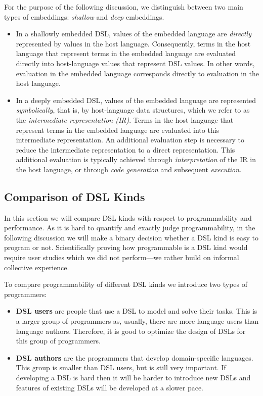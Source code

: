 For the purpose of the following discussion, we distinguish between two main types of embeddings: \emph{shallow} and \emph{deep} embeddings.

  \begin{itemize}

  \item In a shallowly embedded DSL, values of the embedded language
    are \emph{directly} represented by values in the host language.
    Consequently, terms in the host language that represent terms in
    the embedded language are evaluated directly into host-language
    values that represent DSL values. In other words, evaluation in
    the embedded language corresponds directly to evaluation in the
    host language.


  \item In a deeply embedded DSL, values of the embedded language are
    represented \emph{symbolically}, that is, by host-language data
    structures, which we refer to as the \emph{intermediate
      representation (IR)}. Terms in the host language that represent
    terms in the embedded language are evaluated into this intermediate
    representation. An additional evaluation step is necessary to
    reduce the intermediate representation to a direct representation.
    This additional evaluation is typically achieved through
    \emph{interpretation} of the IR in the host language, or through
    \emph{code generation} and subsequent \emph{execution}.

  \end{itemize}


\subsection{Comparison of DSL Kinds}
\label{sec:comparison-of-dsl-kinds}

In this section we will compare DSL kinds with respect to programmability and performance.
 As it is hard to quantify and exactly judge programmability, in the following discussion we
 will make a binary decision whether a DSL kind is easy to program or not. Scientifically proving
 how programmable is a DSL kind would require user studies which we did not perform---we rather
 build on informal collective experience.

To compare programmability of different DSL kinds we introduce two types of programmers:\begin{itemize}
  \item {\bf DSL users} are people that use a DSL to model and solve their tasks.
   This is a larger group of programmers as, usually, there are more language users
   than language authors. Therefore, it is good to optimize the design of DSLs for
   this group of programmers.

  \item {\bf DSL authors} are the programmers that develop domain-specific languages.
   This group is smaller than DSL users, but is still very important. If developing a
   DSL is hard then it will be harder to introduce new DSLs and features of existing
   DSLs will be developed at a slower pace.
 \end{itemize}


